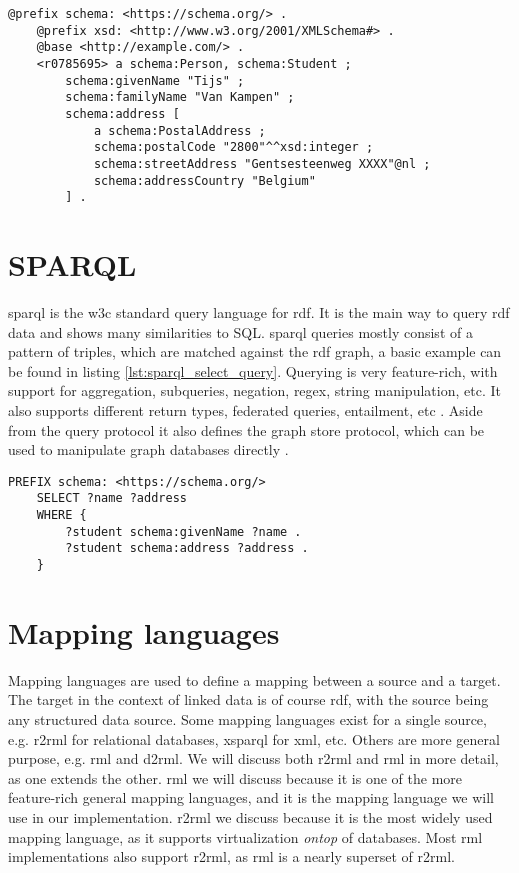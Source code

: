 \begin{lstlisting}[caption={Basic turtle document using turtle features}, label={lst:basic_turtle_example_concise}, captionpos=b, breaklines=true]
    @prefix schema: <https://schema.org/> .
    @prefix xsd: <http://www.w3.org/2001/XMLSchema#> .
    @base <http://example.com/> .
    <r0785695> a schema:Person, schema:Student ;
        schema:givenName "Tijs" ;
        schema:familyName "Van Kampen" ;
        schema:address [
            a schema:PostalAddress ;
            schema:postalCode "2800"^^xsd:integer ;
            schema:streetAddress "Gentsesteenweg XXXX"@nl ;
            schema:addressCountry "Belgium"
        ] .
\end{lstlisting}


\section{SPARQL}
\acrfull{sparql} is the \acrshort{w3c} standard query language for \acrshort{rdf}. It is the main way to query \acrshort{rdf} data and shows many similarities to SQL. \acrshort{sparql} queries mostly consist of a pattern of triples, which are matched against the \acrshort{rdf} graph, a basic example can be found in listing \ref{lst:sparql_select_query}. Querying is very feature-rich, with support for aggregation, subqueries, negation, regex, string manipulation, etc. It also supports different return types, federated queries, entailment, etc \citep{SPARQL1.1QL}. Aside from the query protocol it also defines the graph store protocol, which can be used to manipulate graph databases directly \citep{SPARQL1.1}.

\begin{lstlisting}[language=SPARQL, caption={Example of a basic \acrshort{sparql} SELECT query}, label={lst:sparql_select_query}, captionpos=b]
    PREFIX schema: <https://schema.org/>
    SELECT ?name ?address
    WHERE {
        ?student schema:givenName ?name .
        ?student schema:address ?address .
    }
\end{lstlisting}

\section{Mapping languages}
Mapping languages are used to define a mapping between a source and a target. The target in the context of linked data is of course \acrshort{rdf}, with the source being any structured data source. Some mapping languages exist for a single source, e.g. \acrfull{r2rml} for relational databases, \acrfull{xsparql} for \acrshort{xml}, etc. Others are more general purpose, e.g. \acrfull{rml} and \acrfull{d2rml}.
We will discuss both \acrshort{r2rml} and \acrshort{rml} in more detail, as one extends the other. \acrshort{rml} we will discuss because it is one of the more feature-rich general mapping languages, and it is the mapping language we will use in our implementation. \acrshort{r2rml} we discuss because it is the most widely used mapping language, as it supports virtualization \textit{ontop} of databases. %
Most \acrshort{rml} implementations also support \acrshort{r2rml}, as \acrshort{rml} is a nearly superset of \acrshort{r2rml}.

